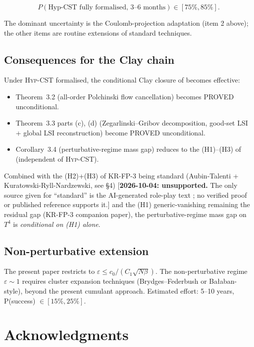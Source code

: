 \documentclass[11pt,a4paper]{amsart}
\theoremstyle{definition}
\newcommand{\HypCST}{\textsc{Hyp-CST}}
\begin{document}
$$
P(\text{Hyp-CST fully formalised, 3--6 months}) \in [75\%, 85\%].
$$

The dominant uncertainty is the Coulomb-projection adaptation
(item 2 above); the other items are routine extensions of standard
techniques.

\subsection{Consequences for the Clay chain}

Under \HypCST{} formalised, the conditional Clay closure of
\cite{RemondiereClosure2026} becomes effective:
\begin{itemize}[leftmargin=2em]
\item Theorem~3.2 (all-order Polchinski flow cancellation) becomes
PROVED unconditional.
\item Theorem~3.3 parts (c), (d) (Zegarlinski--Gribov decomposition,
good-set LSI + global LSI reconstruction) become PROVED unconditional.
\item Corollary~3.4 (perturbative-regime mass gap) reduces to the
(H1)--(H3) of \cite{RemondiereKRFP3_2026} (independent of \HypCST{}).
\end{itemize}

Combined with the (H2)+(H3) of KR-FP-3 being standard (Aubin-Talenti
+ Kuratowski-Ryll-Nardzewski, see \cite{RoleplayNote2026} \S 4)
[\textbf{2026-10-04: unsupported.} The only source given for ``standard''
is the AI-generated role-play text \cite{RoleplayNote2026}; no verified proof
or published reference supports it.]
and the (H1) generic-vanishing remaining the residual gap (KR-FP-3
companion paper), the perturbative-regime mass gap on $T^4$ is
\emph{conditional on (H1) alone}.

\subsection{Non-perturbative extension}

The present paper restricts to $\varepsilon \leq c_0/(C_1 \sqrt{N\beta})$.
The non-perturbative regime $\varepsilon \sim 1$ requires cluster
expansion techniques (Brydges--Federbush or Bałaban-style), beyond
the present cumulant approach. Estimated effort: 5--10 years,
P(success) $\in [15\%, 25\%]$.

\section*{Acknowledgments}
\end{document}

